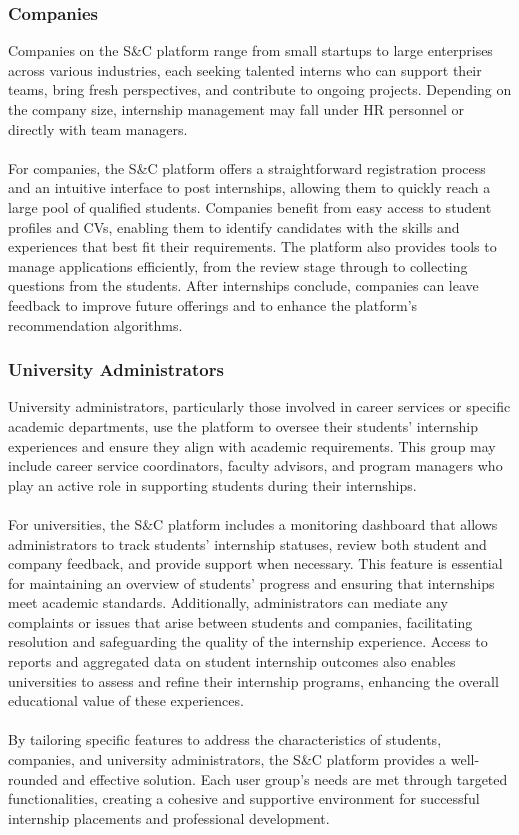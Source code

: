 \subsubsection{Companies}
Companies on the S\&C platform range from small startups to large enterprises across various industries, each seeking talented interns who can support their teams, bring fresh perspectives, and contribute to ongoing projects. Depending on the company size, internship management may fall under HR personnel or directly with team managers. \\ \\
For companies, the S\&C platform offers a straightforward registration process and an intuitive interface to post internships, allowing them to quickly reach a large pool of qualified students. Companies benefit from easy access to student profiles and CVs, enabling them to identify candidates with the skills and experiences that best fit their requirements. The platform also provides tools to manage applications efficiently, from the review stage through to collecting questions from the students. After internships conclude, companies can leave feedback to improve future offerings and to enhance the platform’s recommendation algorithms.

\subsubsection{University Administrators}
University administrators, particularly those involved in career services or specific academic departments, use the platform to oversee their students’ internship experiences and ensure they align with academic requirements. This group may include career service coordinators, faculty advisors, and program managers who play an active role in supporting students during their internships.\\ \\
For universities, the S\&C platform includes a monitoring dashboard that allows administrators to track students’ internship statuses, review both student and company feedback, and provide support when necessary. This feature is essential for maintaining an overview of students’ progress and ensuring that internships meet academic standards. Additionally, administrators can mediate any complaints or issues that arise between students and companies, facilitating resolution and safeguarding the quality of the internship experience. Access to reports and aggregated data on student internship outcomes also enables universities to assess and refine their internship programs, enhancing the overall educational value of these experiences.
\\ \\
By tailoring specific features to address the characteristics of students, companies, and university administrators, the S\&C platform provides a well-rounded and effective solution. Each user group’s needs are met through targeted functionalities, creating a cohesive and supportive environment for successful internship placements and professional development.



